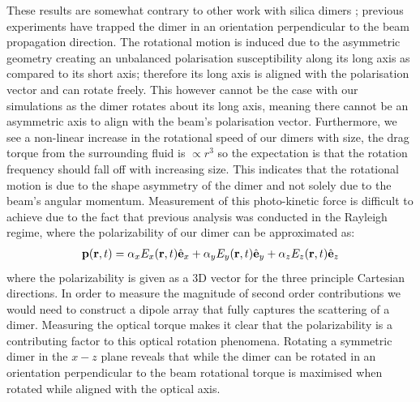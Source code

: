 These results are somewhat contrary to other work with silica dimers
\cite{Ahn2018, Debuysschere2023,Reimann2018}; previous experiments
have trapped the dimer in an orientation perpendicular to the beam
propagation direction.  The rotational motion is induced due to the
asymmetric geometry creating an unbalanced polarisation susceptibility
along its long axis as compared to its short axis; therefore its long
axis is aligned with the polarisation vector and can rotate
freely\cite{Ahn2018}.  This however cannot be the case with our
simulations as the dimer rotates about its long axis, meaning there
cannot be an asymmetric axis to align with the beam's polarisation
vector. Furthermore, we see a non-linear increase in the rotational
speed of our dimers with size, the drag torque from the surrounding
fluid is $\propto r^3$ so the expectation is that the rotation
frequency should fall off with increasing size.  This indicates that
the rotational motion is due to the shape asymmetry of the dimer and
not solely due to the beam's angular momentum.  Measurement of this
photo-kinetic force is difficult to achieve due to the fact that
previous analysis was conducted in the Rayleigh regime, where the
polarizability of our dimer can be approximated as:
\begin{align}
  \bold{p}({\bf r},t)
  =
  \alpha_x E_x({\bf r},t)\hat{\bf e}_x
  + \alpha_yE_y({\bf r},t)\hat{\bf e}_y
  + \alpha_zE_z({\bf r},t)\hat{\bf e}_z
\end{align}
where the polarizability is given as a 3D vector for the three
principle Cartesian directions.  In order to measure the magnitude of
second order contributions we would need to construct a dipole array
that fully captures the scattering of a dimer. Measuring the optical torque 
makes it clear that the polarizability is a contributing factor to this optical 
rotation phenomena. Rotating a symmetric dimer in the $x-z$ plane reveals 
that while the dimer can be rotated in an orientation perpendicular 
to the beam rotational torque is maximised when rotated while aligned with 
the optical axis.
